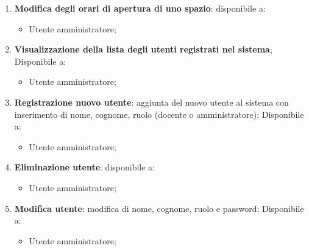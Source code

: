\begin{enumerate}
	\item \textbf{Modifica degli orari di apertura di uno spazio}: disponibile a:
	      \begin{itemize}
		      \item Utente amministratore;
	      \end{itemize}

	\item \textbf{Visualizzazione della lista degli utenti registrati nel
		      sistema}; Disponibile a:
	      \begin{itemize}
		      \item Utente amministratore;
	      \end{itemize}

	\item \textbf{Registrazione nuovo utente}: aggiunta del nuovo utente al
	      sistema con inserimento di nome, cognome, ruolo (docente o amministratore);
	      Disponibile a:
	      \begin{itemize}
		      \item Utente amministratore;
	      \end{itemize}

	\item \textbf{Eliminazione utente}: disponibile a:
	      \begin{itemize}
		      \item Utente amministratore;
	      \end{itemize}

	\item \textbf{Modifica utente}: modifica di nome, cognome, ruolo e password;
	      Disponibile a:
	      \begin{itemize}
		      \item Utente amministratore;
	      \end{itemize}
\end{enumerate}
